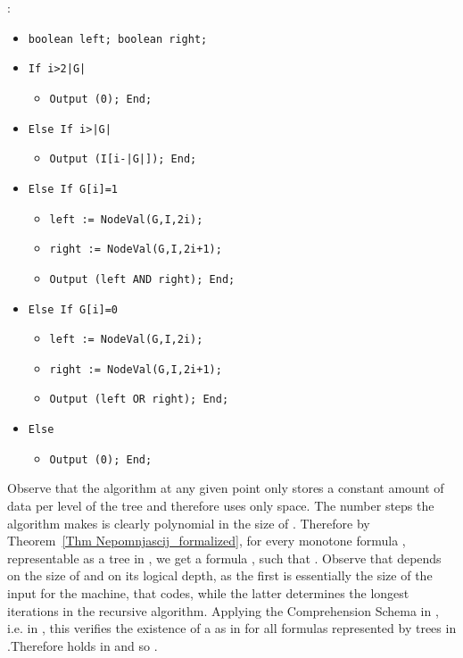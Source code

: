 \documentclass{LMCS}
\newenvironment{proof}{\QuadSpace\par\noindent{\bf
Proof}:}{\EndProof\HalfSpace} \fi
\newcommand{\QuadSpace}{}\newcommand{\HalfSpace}{}\newcommand{\FullSpace}{}\newcommand{\EndProof}{ \hfill \vrule width 1ex height 1ex depth 0pt }
\newenvironment{proof}{

\smallskip
\noindent\emph{Proof.}}{\hfill
\bigskip
} \fi
\begin{document}
\begin{proof}
{\small
\begin{itemize}
  \item \verb"boolean left; boolean right;"
  \item \verb"If i>2"\verb"|G|"
  \begin{itemize}
    \item \verb"Output (0); End;"
  \end{itemize}
  \item \verb"Else If i>|G|"
  \begin{itemize}
    \item \verb"Output (I[i-|G|]); End;"
  \end{itemize}
  \item \verb"Else If G[i]=1"
  \begin{itemize}
    \item \verb"left := NodeVal(G,I,2i);"
    \item \verb"right := NodeVal(G,I,2i+1);"
    \item \verb"Output (left AND right); End;"
\end{itemize}
  \item \verb"Else If G[i]=0"
  \begin{itemize}
    \item \verb"left := NodeVal(G,I,2i);"
    \item \verb"right := NodeVal(G,I,2i+1);"
    \item \verb"Output (left OR right); End;"
\end{itemize}
    \item \verb"Else"
  \begin{itemize}
    \item \verb"Output (0); End;"
  \end{itemize}
\end{itemize}
} 
\noindent Observe that the algorithm at any given point only stores a
constant amount of data per level of the tree  and therefore uses
only  space. The number steps the algorithm makes is
clearly polynomial in the size of . Therefore by Theorem~\ref{Thm
  Nepomnjascij_formalized}, for every monotone formula ,
representable as a tree in , we get a  formula
, such that
. Observe that
 depends on the size of  and on its
logical depth, as the first is essentially the size of the input for
the machine, that  codes, while the latter determines
the longest iterations in the recursive algorithm. Applying the
Comprehension Schema in , i.e. in , this verifies the
existence of a  as in  for all formulas represented by trees
in .Therefore  holds in  and so .
\end{proof}
\end{document}
